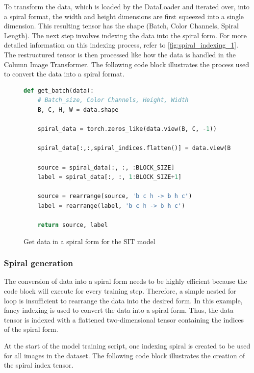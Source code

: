     To transform the data, which is loaded by the DataLoader and iterated over, into a spiral format, the width and height dimensions are first squeezed into a single dimension. This resulting tensor has the shape (Batch, Color Channels, Spiral Length). The next step involves indexing the data into the spiral form. For more detailed information on this indexing process, refer to \autoref{fig:spiral_indexing_1}. The restructured tensor is then processed like how the data is handled in the Column Image Transformer. The following code block illustrates the process used to convert the data into a spiral format.

    \begin{figure}[H]
        \centering
        \begin{lstlisting}[language=Python]
def get_batch(data):
    # Batch_size, Color Channels, Height, Width
    B, C, H, W = data.shape

    spiral_data = torch.zeros_like(data.view(B, C, -1))

    spiral_data[:,:,spiral_indices.flatten()] = data.view(B, C, -1)

    source = spiral_data[:, :, :BLOCK_SIZE]
    label = spiral_data[:, :, 1:BLOCK_SIZE+1]

    source = rearrange(source, 'b c h -> b h c')
    label = rearrange(label, 'b c h -> b h c')

    return source, label
        \end{lstlisting}
        \caption{Get data in a spiral form for the SIT model}
        \label{fig:spiral_indexing_code}
    \end{figure}

    \subsubsection{Spiral generation}
    \label{sec:spiral_generation}
    The conversion of data into a spiral form needs to be highly efficient because the code block will execute for every training step. Therefore, a simple nested for loop is insufficient to rearrange the data into the desired form. In this example, fancy indexing is used to convert the data into a spiral form. Thus, the data tensor is indexed with a flattened two-dimensional tensor containing the indices of the spiral form.

    At the start of the model training script, one indexing spiral is created to be used for all images in the dataset. The following code block illustrates the creation of the spiral index tensor.

